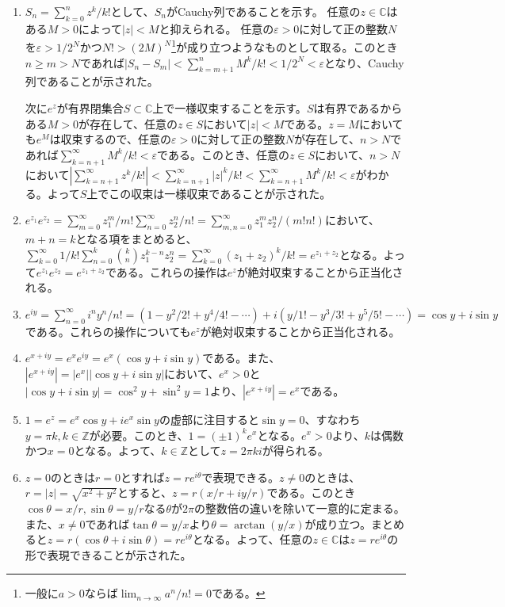 \begin{kaitou*}
\begin{enumerate}
\item $S_{n}=\sum_{k=0}^{n}z^{k}/k!$として、$S_{n}$がCauchy列であることを示す。
任意の$z\in\mathbb{C}$はある$M>0$によって$|z|<M$と抑えられる。
任意の$\varepsilon>0$に対して正の整数$N$を$\varepsilon>1/2^N$かつ$N!>(2M)^{N}$\footnote{一般に$a>0$ならば$\lim_{n\to\infty}a^n/n!=0$である。}が成り立つようなものとして取る。このとき$n\geq m > N$であれば$|S_n-S_m|<\sum_{k=m+1}^{n}M^{k}/k!<1/2^{N}<\varepsilon$となり、Cauchy列であることが示された。

次に$e^z$が有界閉集合$S\subset\mathbb{C}$上で一様収束することを示す。$S$は有界であるからある$M>0$が存在して、任意の$z\in S$において$|z|<M$である。$z=M$においても$e^{M}$は収束するので、任意の$\varepsilon>0$に対して正の整数$N$が存在して、$n>N$であれば$\sum_{k=n+1}^{\infty}M^{k}/k!<\varepsilon$である。このとき、任意の$z\in S$において、$n>N$において$|\sum_{k=n+1}^{\infty}z^{k}/k!|<\sum_{k=n+1}^{\infty}|z|^{k}/k!<\sum_{k=n+1}^{\infty}M^{k}/k!<\varepsilon$がわかる。よって$S$上でこの収束は一様収束であることが示された。

\item $e^{z_1}e^{z_2}=\sum_{m=0}^{\infty}z_1^{m}/m!\sum_{n=0}^{\infty}z_2^{n}/n!=\sum_{m,n=0}^{\infty}z_1^m z_2^n/(m!n!)$において、$m+n=k$となる項をまとめると、$\sum_{k=0}^{\infty}1/k!\sum_{n=0}^{k}\binom{k}{n}z_1^{k-n}z_2^n=\sum_{k=0}^{\infty}(z_1+z_2)^k/k!=e^{z_1+z_2}$となる。よって$e^{z_1}e^{z_2}=e^{z_1+z_2}$である。これらの操作は$e^{z}$が絶対収束することから正当化される。

\item $e^{iy}=\sum_{n=0}^{\infty}i^n y^n/n!=(1-y^2/2!+y^4/4!-\cdots)+i(y/1!-y^3/3!+y^5/5!-\cdots)=\cos y+i\sin y$である。これらの操作についても$e^{z}$が絶対収束することから正当化される。

\item $e^{x+iy}=e^{x}e^{iy}=e^{x}(\cos y+i\sin y)$である。また、$|e^{x+iy}|=|e^{x}||\cos y+i\sin y|$において、$e^{x}>0$と$|\cos y+i\sin y|=\cos^{2}y+\sin^{2}y=1$より、$|e^{x+iy}|=e^{x}$である。

\item $1=e^{z}=e^{x}\cos y+i e^{x}\sin y$の虚部に注目すると$\sin y=0$、すなわち$y=\pi k, k\in\mathbb{Z}$が必要。このとき、$1=(\pm 1)^k e^x$となる。$e^{x}>0$より、$k$は偶数かつ$x=0$となる。よって、$k\in\mathbb{Z}$として$z=2\pi ki$が得られる。

\item $z=0$のときは$r=0$とすれば$z=re^{i\theta}$で表現できる。$z\neq 0$のときは、$r=|z|=\sqrt{x^2+y^2}$とすると、$z=r(x/r+iy/r)$である。このとき$\cos\theta=x/r,\sin\theta=y/r$なる$\theta$が$2\pi$の整数倍の違いを除いて一意的に定まる。また、$x\neq 0$であれば$\tan\theta=y/x$より$\theta=\arctan(y/x)$が成り立つ。まとめると$z=r(\cos\theta+i\sin\theta)=re^{i\theta}$となる。よって、任意の$z\in\mathbb{C}$は$z=re^{i\theta}$の形で表現できることが示された。


\end{enumerate}
\end{kaitou*}
